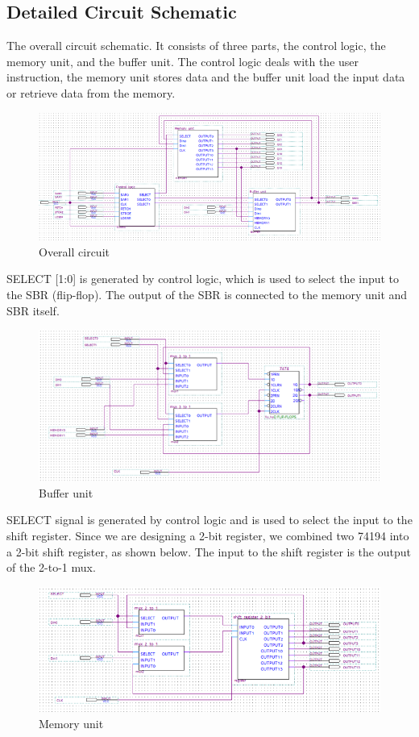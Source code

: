 \documentclass[12pt]{article}
\begin{document}
\subsection{\textbf{Detailed Circuit Schematic}}
The overall circuit schematic. It consists of three parts, the control logic, the memory unit, and the buffer unit. The control logic deals with the user instruction, the memory unit stores data and the buffer unit load the input data or retrieve data from the memory.
\begin{figure}[H]
    \centering
    \includegraphics[width=15cm]{overall_circuit.png}
    \caption{Overall circuit}
\end{figure}
SELECT [1:0] is generated by control logic, which is used to select the input to the SBR (flip-flop). The output of the SBR is connected to the memory unit and SBR itself. 
\begin{figure}[H]
    \centering
    \includegraphics[width=15cm]{buffer_unit.png}
    \caption{Buffer unit}
\end{figure}
SELECT signal is generated by control logic and is used to select the input to the shift register. Since we are designing a 2-bit register, we combined two 74194 into a 2-bit shift register, as shown below. The input to the shift register is the output of the 2-to-1 mux.
\begin{figure}[H]
    \centering
    \includegraphics[width=15cm]{memory_unit.png}
    \caption{Memory unit}
\end{figure}
\end{document}
